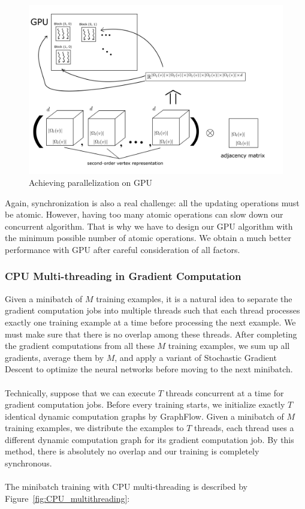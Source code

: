 \documentclass[a4paper]{article}
\begin{document}
\begin{figure}[h]
\caption{Achieving parallelization on GPU}
\label{fig:GPU_architecture}
\includegraphics[width=\columnwidth]{GPU_multithreading.png}
\end{figure}


Again, synchronization is also a real challenge: all the updating operations must be atomic. However, having too many atomic operations can slow down our concurrent algorithm. That is why we have to design our GPU algorithm with the minimum possible number of atomic operations. We obtain a much better performance with GPU after careful consideration of all factors.

\subsubsection{CPU Multi-threading in Gradient Computation}

Given a minibatch of $M$ training examples, it is a natural idea to separate the gradient computation jobs into multiple threads such that each thread processes exactly one training example at a time before processing the next example. We must make sure that there is no overlap among these threads. After completing the gradient computations from all these $M$ training examples, we sum up all gradients, average them by $M$, and apply a variant of Stochastic Gradient Descent to optimize the neural networks before moving to the next minibatch. \\ \\
Technically, suppose that we can execute $T$ threads concurrent at a time for gradient computation jobs. Before every training starts, we initialize exactly $T$ identical dynamic computation graphs by GraphFlow. Given a minibatch of $M$ training examples, we distribute the examples to $T$ threads, each thread uses a different dynamic computation graph for its gradient computation job. By this method, there is absolutely no overlap and our training is completely synchronous. \\ \\
The minibatch training with CPU multi-threading is described by Figure~\ref{fig:CPU_multithreading}: 
\end{document}
